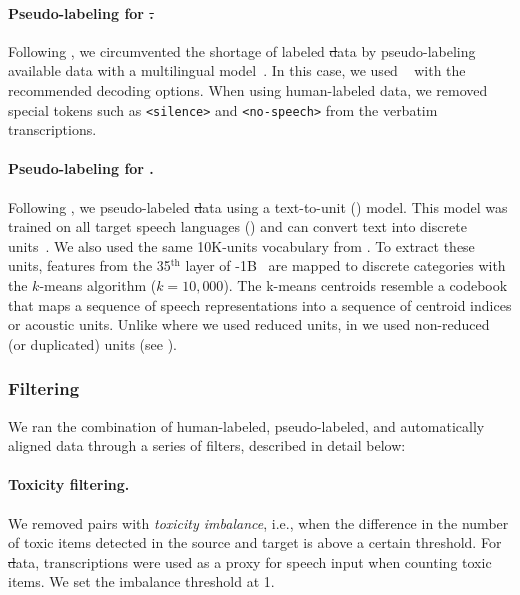 \paragraph{Pseudo-labeling for \st.}
Following \citet{SeamlessM4TArXiv}, we circumvented the shortage of labeled \st data by pseudo-labeling available \asr data with a multilingual \mt model~\citep{jia2019leveraging, Pino2020SelfTrainingFE}. In this case, we used \nllbmedium~\citep{nllb2022} with the recommended decoding options. 
When using human-labeled data, we removed special tokens such as \texttt{<silence>} and \texttt{<no-speech>} from the verbatim transcriptions. 

\paragraph{Pseudo-labeling for \sst.}
Following \citet{SeamlessM4TArXiv}, we pseudo-labeled \st data using a text-to-unit (\tu) model.
This \tu model was trained on all \nvocoderlangs target speech languages () and can convert text into discrete units~\citep{tjandra2019speech,lee-etal-2022-direct,lee-etal-2022-textless,zhang-etal-2022-speechut,chen-etal-2023-speech}.  
We also used the same 10K-units vocabulary from \citet{SeamlessM4TArXiv}. 
To extract these units, features from the 35$^\text{th}$ layer of \xlsr-1B~\citep{babu2021xls}
are mapped to discrete categories with the $k$-means algorithm ($k{=}10,000$).
The k-means centroids resemble a codebook that maps a sequence of \xlsr speech representations into a sequence of centroid indices or acoustic units.
Unlike \mfourt where we used reduced units, in \mfourttwo we used non-reduced (or duplicated) units (see ).

\subsubsection{Filtering}\label{sec:offline:filtering}
We ran the combination of human-labeled, pseudo-labeled, and automatically aligned data through a series of filters, described in detail below:

\paragraph{Toxicity filtering.}
We removed pairs with \emph{toxicity imbalance}, i.e., when the difference in the number of toxic items detected in the source and target is above a certain threshold. For \st data, transcriptions were used as a proxy for speech input when counting toxic items. We set the imbalance threshold at 1. 

